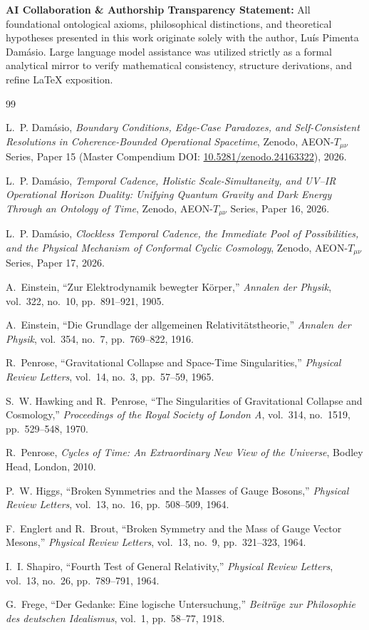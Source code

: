 \documentclass[11pt,a4paper]{article}
\theoremstyle{remark}
\begin{document}
\bigskip
\noindent\textbf{AI Collaboration \& Authorship Transparency Statement:} All foundational ontological axioms, philosophical distinctions, and theoretical hypotheses presented in this work originate solely with the author, Lu\'is Pimenta Dam\'asio. Large language model assistance was utilized strictly as a formal analytical mirror to verify mathematical consistency, structure derivations, and refine LaTeX exposition.

\begin{thebibliography}{99}

L.~P. Dam\'asio, \emph{Boundary Conditions, Edge-Case Paradoxes, and Self-Consistent Resolutions in Coherence-Bounded Operational Spacetime}, Zenodo, AEON-$T_{\mu\nu}$ Series, Paper 15 (Master Compendium DOI: \href{https://doi.org/10.5281/zenodo.24163322}{10.5281/zenodo.24163322}), 2026.

L.~P. Dam\'asio, \emph{Temporal Cadence, Holistic Scale-Simultaneity, and UV--IR Operational Horizon Duality: Unifying Quantum Gravity and Dark Energy Through an Ontology of Time}, Zenodo, AEON-$T_{\mu\nu}$ Series, Paper 16, 2026.

L.~P. Dam\'asio, \emph{Clockless Temporal Cadence, the Immediate Pool of Possibilities, and the Physical Mechanism of Conformal Cyclic Cosmology}, Zenodo, AEON-$T_{\mu\nu}$ Series, Paper 17, 2026.

A.~Einstein, ``Zur Elektrodynamik bewegter K\"orper,'' \emph{Annalen der Physik}, vol.~322, no.~10, pp.~891--921, 1905.

A.~Einstein, ``Die Grundlage der allgemeinen Relativit\"atstheorie,'' \emph{Annalen der Physik}, vol.~354, no.~7, pp.~769--822, 1916.

R.~Penrose, ``Gravitational Collapse and Space-Time Singularities,'' \emph{Physical Review Letters}, vol.~14, no.~3, pp.~57--59, 1965.

S.~W. Hawking and R.~Penrose, ``The Singularities of Gravitational Collapse and Cosmology,'' \emph{Proceedings of the Royal Society of London A}, vol.~314, no.~1519, pp.~529--548, 1970.

R.~Penrose, \emph{Cycles of Time: An Extraordinary New View of the Universe}, Bodley Head, London, 2010.

P.~W. Higgs, ``Broken Symmetries and the Masses of Gauge Bosons,'' \emph{Physical Review Letters}, vol.~13, no.~16, pp.~508--509, 1964.

F.~Englert and R.~Brout, ``Broken Symmetry and the Mass of Gauge Vector Mesons,'' \emph{Physical Review Letters}, vol.~13, no.~9, pp.~321--323, 1964.

I.~I. Shapiro, ``Fourth Test of General Relativity,'' \emph{Physical Review Letters}, vol.~13, no.~26, pp.~789--791, 1964.

G.~Frege, ``Der Gedanke: Eine logische Untersuchung,'' \emph{Beitr\"age zur Philosophie des deutschen Idealismus}, vol.~1, pp.~58--77, 1918.

\end{thebibliography}
\end{document}

